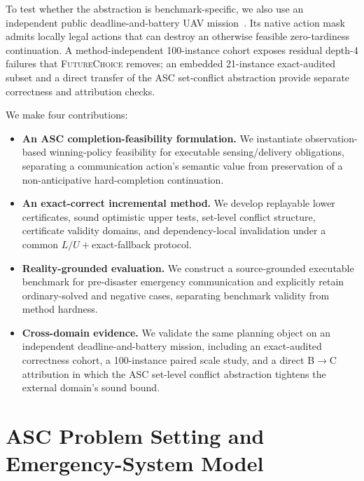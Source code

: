 \documentclass[conference]{IEEEtran}
\newcommand{\futurechoice}{\textsc{FutureChoice}\xspace}
\begin{document}
To test whether the abstraction is benchmark-specific, we also use an independent public deadline-and-battery UAV mission~\cite{dehghani2026uavattention}. Its native action mask admits locally legal actions that can destroy an otherwise feasible zero-tardiness continuation. A method-independent 100-instance cohort exposes residual depth-4 failures that \futurechoice removes; an embedded 21-instance exact-audited subset and a direct transfer of the ASC set-conflict abstraction provide separate correctness and attribution checks.

We make four contributions:
\begin{itemize}
  \item \textbf{An ASC completion-feasibility formulation.} We instantiate observation-based winning-policy feasibility for executable sensing/delivery obligations, separating a communication action's semantic value from preservation of a non-anticipative hard-completion continuation.
  \item \textbf{An exact-correct incremental method.} We develop replayable lower certificates, sound optimistic upper tests, set-level conflict structure, certificate validity domains, and dependency-local invalidation under a common $L/U+$exact-fallback protocol.
  \item \textbf{Reality-grounded evaluation.} We construct a source-grounded executable benchmark for pre-disaster emergency communication and explicitly retain ordinary-solved and negative cases, separating benchmark validity from method hardness.
  \item \textbf{Cross-domain evidence.} We validate the same planning object on an independent deadline-and-battery mission, including an exact-audited correctness cohort, a 100-instance paired scale study, and a direct B$\rightarrow$C attribution in which the ASC set-level conflict abstraction tightens the external domain's sound bound.
\end{itemize}

\section{ASC Problem Setting and Emergency-System Model}
\label{sec:model}
\end{document}
